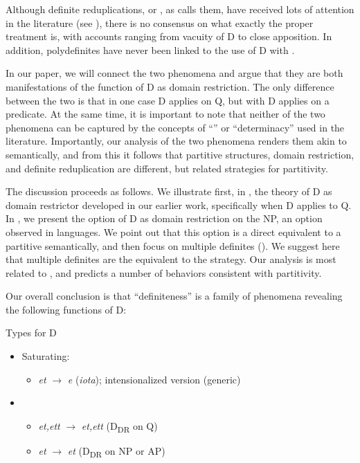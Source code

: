 \documentclass[output=paper,
modfonts
]{langscibook}
\begin{document}
Although  definite reduplications, or , as \citet{kolliakou2004} calls them, have received lots of attention in the literature (see \citealt{AlexiadouWilder1998b, CamposStravrou2004, kolliakou2004, ioannidou-dendikken2006, lekakou-szendroi2007}), there is no consensus on what exactly the proper treatment is, with accounts ranging from vacuity of D to close apposition. In addition, polydefinites have never been linked to the use of D with . 

In our paper, we will connect the two phenomena and argue that they are both manifestations of the function of D as domain restriction. The only difference between the two is that in one case D applies on Q, but with  D applies on a predicate. At the same time, it is important to note that neither of the two phenomena can be captured by the concepts of ``'' or ``determinacy'' \citep{CoppockBeaver2015} used in the literature. Importantly, our analysis of the two phenomena renders them akin to  semantically, and from this it follows that partitive structures, domain restriction, and definite reduplication are different, but related strategies for partitivity. 

The discussion proceeds as follows. We illustrate first, in , the theory of D as domain restrictor developed in our earlier work, specifically when D applies to Q. In , we present the option of D as domain restriction on the NP, an option observed in  languages. We point out that this option is a direct equivalent to a partitive semantically, and then focus on multiple definites (). We suggest here that multiple definites are the  equivalent to the  strategy. Our analysis is most related to \citet{kolliakou2004}, and predicts a number of behaviors consistent with partitivity.

Our overall conclusion is that ``definiteness'' is a family of phenomena revealing the following functions of D: \newpage 

\ea\label{ex:etxeberria:15}
{Types for D}
\begin{itemize}
	\item {Saturating:} 
	\begin{itemize}
		\item \textit{et} $\rightarrow$ \textit{e} (\textit{iota}); intensionalized version (generic)
	\end{itemize} 
	\item {}
	\begin{itemize}
		\item \textit{et,ett} $\rightarrow$ \textit{et,ett} (D\textsubscript{DR} on Q)
		\item \textit{et} $\rightarrow$ \textit{et} (D\textsubscript{DR} on NP or AP)
	\end{itemize}
\end{itemize}
\z
\end{document}
